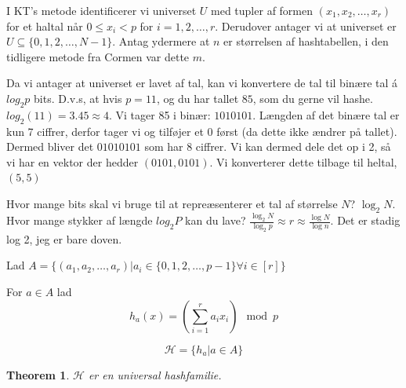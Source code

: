 \documentclass[11pt]{article}
\newtheorem{theorem}{Theorem}
\theoremstyle{definition}
\theoremstyle{remark}
\begin{document}
I KT's metode identificerer vi universet $U$ med tupler af formen $(x_{1}, x_{2}, \ldots, x_{r})$ for et haltal når $0 \leq x_{i} < p$ for $i = 1, 2, \ldots, r$. Derudover antager vi at universet er $U \subseteq \{0, 1, 2, \ldots, N-1\}$. Antag ydermere at $n$ er størrelsen af hashtabellen, i den tidligere metode fra Cormen var dette $m$.

Da vi antager at universet er lavet af tal, kan vi konvertere de tal til binære tal á $log_{2}p$ bits. D.v.s, at hvis $p = 11$, og du har tallet $85$, som du gerne vil hashe. $log_{2}(11) = 3.45 \approx 4$. Vi tager 85 i binær: $1010101$. Længden af det binære tal er kun 7 ciffrer, derfor tager vi og tilføjer et 0 først (da dette ikke ændrer på tallet). Dermed bliver det $01010101$ som har 8 ciffrer. Vi kan dermed dele det op i 2, så vi har en vektor der hedder $(0101, 0101)$. Vi konverterer dette tilbage til heltal, $(5,5)$

 Hvor mange bits skal vi bruge til  at repreæsenterer et tal af størrelse $N$? $\log_{2}N$. Hvor mange stykker af længde $log_{2}P$ kan du lave? $\frac{\log_{2}N}{\log_{2}p} \approx r \approx \frac{\log N}{\log n}$. Det er stadig log 2, jeg er bare doven.

Lad $A = \{(a_{1}, a_{2}, \ldots, a_{r}) | a_{i} \in \{0, 1, 2, \ldots, p-1\} \forall i \in [r]\}$

For $a \in A$ lad
\[ h_{a}(x) = \left( \sum_{i=1}^{r} a_{i}x_{i} \right) \mod p \]

\[ \mathcal{H} = \{h_{a} | a \in A\} \]

\begin{theorem}
  $\mathcal{H}$ er en universal hashfamilie.
\end{theorem}
\end{document}
